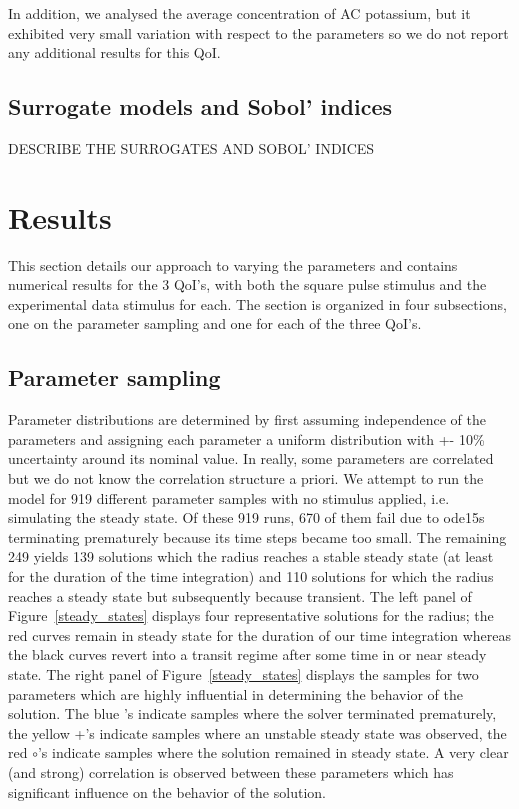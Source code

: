\documentclass[12pt]{article}
\numberwithin{equation}{section}
\begin{document}
In addition, we analysed the average concentration of AC potassium, but it exhibited very small variation with respect to the parameters so we do not report any additional results for this QoI.

\subsection{Surrogate models and Sobol' indices}
DESCRIBE THE SURROGATES AND SOBOL' INDICES

\section{Results}
This section details our approach to varying the parameters and contains numerical results for the 3 QoI's, with both the square pulse stimulus and the experimental data stimulus for each. The section is organized in four subsections, one on the parameter sampling and one for each of the three QoI's.

\subsection{Parameter sampling}
Parameter distributions are determined by first assuming independence of the parameters and assigning each parameter a uniform distribution with +- 10\% uncertainty around its nominal value. In really, some parameters are correlated but we do not know the correlation structure a priori. We attempt to run the model for 919 different parameter samples with no stimulus applied, i.e. simulating the steady state. Of these 919 runs, 670 of them fail due to ode15s terminating prematurely because its time steps became too small. The remaining 249 yields 139 solutions which the radius reaches a stable steady state (at least for the duration of the time integration) and 110 solutions for which the radius reaches a steady state but subsequently because transient. The left panel of Figure~\ref{steady_states} displays four representative solutions for the radius; the red curves remain in steady state for the duration of our time integration whereas the black curves revert into a transit regime after some time in or near steady state. The right panel of Figure~\ref{steady_states} displays the samples for two parameters which are highly influential in determining the behavior of the solution. The blue \*'s indicate samples where the solver terminated prematurely, the yellow +'s indicate samples where an unstable steady state was observed, the red $\circ$'s indicate samples where the solution remained in steady state. A very clear (and strong) correlation is observed between these parameters which has significant influence on the behavior of the solution.
\end{document}
